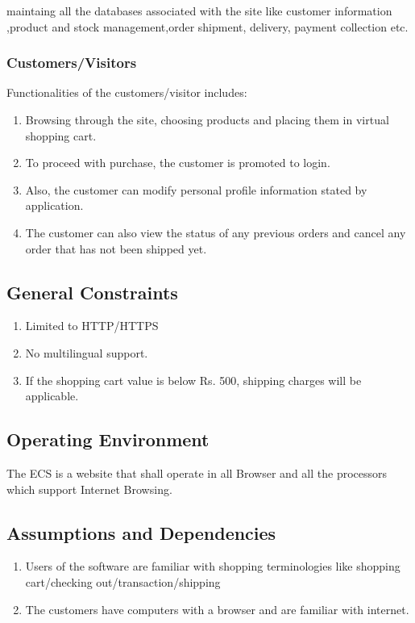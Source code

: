 \documentclass{article}
\begin{document}
 maintaing all the databases associated with the site like customer information ,product and stock management,order shipment, delivery, payment collection etc.

\subsubsection{Customers/Visitors}
Functionalities of the customers/visitor includes:
\begin{enumerate}
\item Browsing  through the site, choosing products and placing them  in virtual shopping cart.
\item To proceed with purchase, the customer is promoted to login.
\item Also, the customer can modify personal profile information stated by application.
\item The customer can also view the status of any previous orders and cancel any order that has not been shipped yet.
\end{enumerate}



\subsection{General Constraints}
\begin{enumerate}
\item Limited to HTTP/HTTPS
\item No multilingual support.
\item If the shopping cart value is below Rs. 500, shipping charges will be applicable. 
\end{enumerate}
\subsection{Operating Environment}
The ECS is a website that shall operate in all Browser and all the processors which support Internet Browsing.
\subsection{Assumptions and Dependencies}
\begin{enumerate}
\item Users of  the software are familiar with shopping terminologies like shopping cart/checking out/transaction/shipping
\item The customers have computers with a browser and are familiar with internet.
\end{enumerate}
\end{document}
